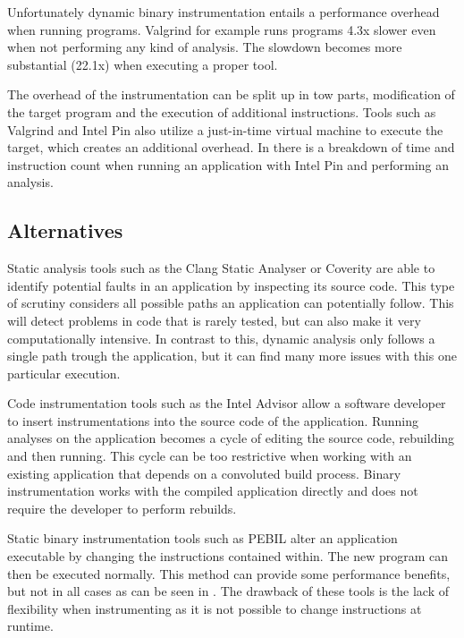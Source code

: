 Unfortunately dynamic binary instrumentation entails a performance overhead when running programs. Valgrind for example runs programs 4.3x slower \cite{valgrind} even when not performing any kind of analysis. The slowdown becomes more substantial (22.1x) when executing a proper tool.

The overhead of the instrumentation can be split up in tow parts, modification of the target program and the execution of additional instructions. Tools such as Valgrind and Intel Pin also utilize a just-in-time virtual machine to execute the target, which creates an additional overhead. In \cite{instoverhead} there is a breakdown of time and instruction count when running an application with Intel Pin and performing an analysis.

\subsection{Alternatives}

Static analysis tools such as the Clang Static Analyser \cite{clang} or Coverity \cite{coverity} are able to identify potential faults in an application by inspecting its source code. This type of scrutiny considers all possible paths an application can potentially follow. This will detect problems in code that is rarely tested, but can also make it very computationally intensive. In contrast to this, dynamic analysis only follows a single path trough the application, but it can find many more issues with this one particular execution.

Code instrumentation tools such as the Intel Advisor \cite{inteladvisor} allow a software developer to insert instrumentations into the source code of the application. Running analyses on the application becomes a cycle of editing the source code, rebuilding and then running. This cycle can be too restrictive when working with an existing application that depends on a convoluted build process. Binary instrumentation works with the compiled application directly and does not require the developer to perform rebuilds.

Static binary instrumentation tools such as PEBIL \cite{pebil} alter an application executable by changing the instructions contained within. The new program can then be executed normally. This method can provide some performance benefits, but not in all cases as can be seen in \cite{pebilperf}. The drawback of these tools is the lack of flexibility when instrumenting as it is not possible to change instructions at runtime.

